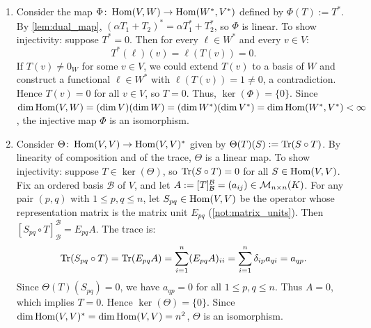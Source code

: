 \begin{exercisesolution}
\label{sol:hom_dual_isomorphism_trace_pairing}
\begin{enumerate}[label=\textbf{(\alph*)}]
    \item Consider the map $\Phi \colon \operatorname{Hom}(V, W) \to \operatorname{Hom}(W^*, V^*)$ defined by $\Phi(T) := T^*$.
    By \cref{lem:dual_map}, $(\alpha T_1 + T_2)^* = \alpha T_1^* + T_2^*$, so $\Phi$ is linear.
    To show injectivity: suppose $T^* = 0$. Then for every $\ell \in W^*$ and every $v \in V$:
    \[
    T^*(\ell)(v) = \ell(T(v)) = 0.
    \]
    If $T(v) \ne 0_W$ for some $v \in V$, we could extend $T(v)$ to a basis of $W$ and construct a functional $\ell \in W^*$ with $\ell(T(v)) = 1 \ne 0$, a contradiction.
    Hence $T(v) = 0$ for all $v \in V$, so $T = 0$. Thus, $\ker(\Phi) = \{0\}$.
    Since $\dim \operatorname{Hom}(V, W) = (\dim V)(\dim W) = (\dim W^*)(\dim V^*) = \dim \operatorname{Hom}(W^*, V^*) < \infty$, the injective map $\Phi$ is an isomorphism.

    \item Consider $\Theta \colon \operatorname{Hom}(V, V) \to \operatorname{Hom}(V, V)^*$ given by $\Theta(T)(S) := \operatorname{Tr}(S \circ T)$.
    By linearity of composition and of the trace, $\Theta$ is a linear map.
    To show injectivity: suppose $T \in \ker(\Theta)$, so $\operatorname{Tr}(S \circ T) = 0$ for all $S \in \operatorname{Hom}(V, V)$.
    Fix an ordered basis $\mathcal{B}$ of $V$, and let $A := [T]_{\mathcal{B}}^{\mathcal{B}} = (a_{ij}) \in \mathcal{M}_{n \times n}(K)$.
    For any pair $(p, q)$ with $1 \le p, q \le n$, let $S_{pq} \in \operatorname{Hom}(V, V)$ be the operator whose representation matrix is the matrix unit $E_{pq}$ (\cref{not:matrix_units}).
    Then $[S_{pq} \circ T]_{\mathcal{B}}^{\mathcal{B}} = E_{pq} A$.
    The trace is:
    \[
    \operatorname{Tr}(S_{pq} \circ T) = \operatorname{Tr}(E_{pq} A) = \sum_{i=1}^n (E_{pq} A)_{ii} = \sum_{i=1}^n \delta_{ip} a_{qi} = a_{qp}.
    \]
    Since $\Theta(T)(S_{pq}) = 0$, we have $a_{qp} = 0$ for all $1 \le p, q \le n$.
    Thus $A = 0$, which implies $T = 0$.
    Hence $\ker(\Theta) = \{0\}$. Since $\dim \operatorname{Hom}(V, V)^* = \dim \operatorname{Hom}(V, V) = n^2$, $\Theta$ is an isomorphism. \qedhere
\end{enumerate}
\end{exercisesolution}


